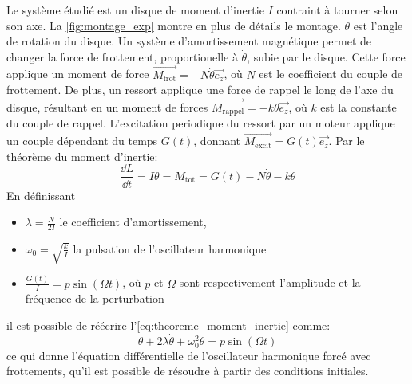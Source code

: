 Le système étudié est un disque de moment d'inertie \(I\) contraint à tourner selon son axe. La \autoref{fig:montage_exp} montre en plus de détails le montage. \(\theta\) est l'angle de rotation du disque. Un système d'amortissement magnétique permet de changer la force de frottement, proportionelle à \(\dot \theta\), subie par le disque. Cette force applique un moment de force \(\overrightarrow{M_\textrm{frot}} = -N \dot\theta \vec{e_z}\), où \(N\) est le coefficient du couple de frottement. De plus, un ressort applique une force de rappel le long de l'axe du disque, résultant en un moment de forces \(\overrightarrow{M_\textrm{rappel}} = -k \theta \vec{e_z}\), où \(k\) est la constante du couple de rappel. L'excitation periodique du ressort par un moteur applique un couple dépendant du temps \(G(t)\), donnant \(\overrightarrow{M_\textrm{excit}} = G(t) \vec{e_z}\). Par le théorème du moment d'inertie:
\begin{equation}
    \frac{\dd L}{\dd t} = I \ddot \theta = M_\textrm{tot} = G(t) - N \dot\theta - k\theta
    \label{eq:theoreme_moment_inertie}
\end{equation}
En définissant
\begin{itemize}
    \item \(\lambda = \frac{N}{2I}\) le coefficient d'amortissement,
    \item \(\omega_0 = \sqrt{\frac{k}{I}}\) la pulsation de l'oscillateur harmonique
    \item \(\frac{G(t)}{I} = p \sin (\Omega t)\), où \(p\) et \(\Omega\) sont respectivement l'amplitude et la fréquence de la perturbation
\end{itemize}
il est possible de réécrire l'\autoref{eq:theoreme_moment_inertie} comme:
\begin{equation}
    \ddot\theta + 2\lambda\dot\theta + \omega_0^2\theta = p \sin (\Omega t)
    \label{eq:mouvement}
\end{equation}
ce qui donne l'équation différentielle de l'oscillateur harmonique forcé avec frottements, qu'il est possible de résoudre à partir des conditions initiales.

